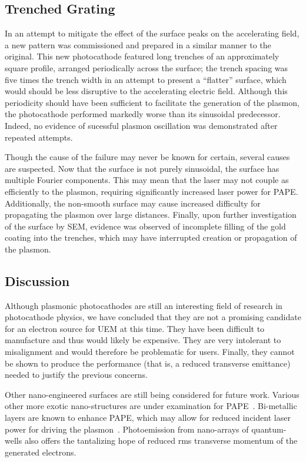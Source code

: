 \subsection{Trenched Grating}

In an attempt to mitigate the effect of the surface peaks on the accelerating field, a new pattern was commissioned and prepared in a similar manner to the original.
This new photocathode featured long trenches of an approximately square profile, arranged periodically across the surface; the trench spacing was five times the trench width in an attempt to present a ``flatter'' surface, which would should be less disruptive to the accelerating electric field.
Although this periodicity should have been sufficient to facilitate the generation of the plasmon, the photocathode performed markedly worse than its sinusoidal predecessor.
Indeed, no evidence of sucessful plasmon oscillation was demonstrated after repeated attempts.

Though the cause of the failure may never be known for certain, several causes are suspected.
Now that the surface is not purely sinusoidal, the surface has multiple Fourier components.
This may mean that the laser may not couple as efficiently to the plasmon, requiring significantly increased laser power for PAPE. 
Additionally, the non-smooth surface may cause increased difficulty for propagating the plasmon over large distances.
Finally, upon further investigation of the surface by SEM, evidence was observed of incomplete filling of the gold coating into the trenches, which may have interrupted creation or propagation of the plasmon.

\subsection{Discussion}

Although plasmonic photocathodes are still an interesting field of research in photocathode physics, we have concluded that they are not a promising candidate for an electron source for UEM at this time.
They have been difficult to manufacture and thus would likely be expensive.
They are very intolerant to misalignment and would therefore be problematic for users.
Finally, they cannot be shown to produce the performance (that is, a reduced transverse emittance) needed to justify the previous concerns.

Other nano-engineered surfaces are still being considered for future work.
Various other more exotic nano-structures are under examination for PAPE~\cite{li_surface_2013,polyakov_plasmon_2013}.
Bi-metallic layers are known to enhance PAPE, which may allow for reduced incident laser power for driving the plasmon~\cite{kupersztych_anomalous_2005}.
Photoemission from nano-arrays of quantum-wells also offers the tantalizing hope of reduced rms transverse momentum of the generated electrons.

